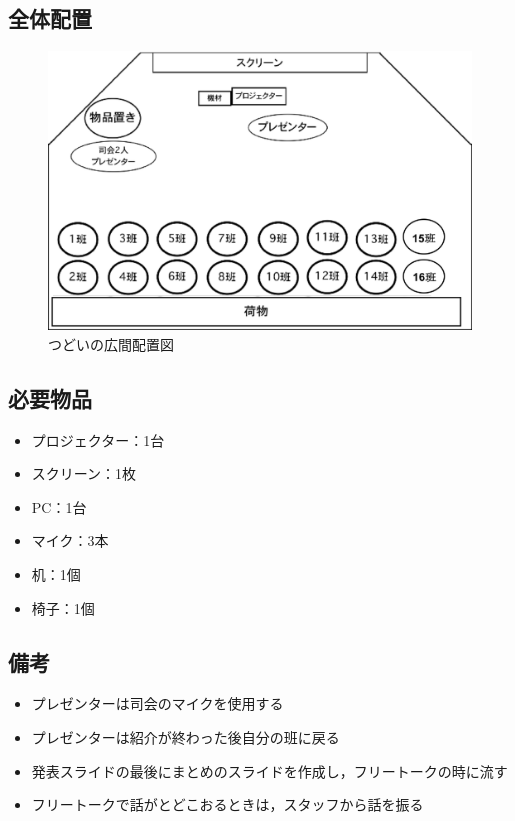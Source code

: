\documentclass[a4j,titlepage]{jarticle}
\begin{document}
\subsection{全体配置}
\begin{figure}[h]
  \begin{center}
    \includegraphics[scale=0.5]{./23/tudoi.eps}
    \caption{つどいの広間配置図}
    \label{fig:A1}
  \end{center}
\end{figure}

\subsection{必要物品}
 \begin{itemize}
 \item プロジェクター：1台
 \item スクリーン：1枚
 \item PC：1台
 \item マイク：3本
 \item 机：1個
 \item 椅子：1個
 \end{itemize}

\subsection{備考}
 \begin{itemize}
 \item プレゼンターは司会のマイクを使用する
 \item プレゼンターは紹介が終わった後自分の班に戻る
 \item 発表スライドの最後にまとめのスライドを作成し，フリートークの時に流す
 \item フリートークで話がとどこおるときは，スタッフから話を振る
 \end{itemize}

%
\end{document}
